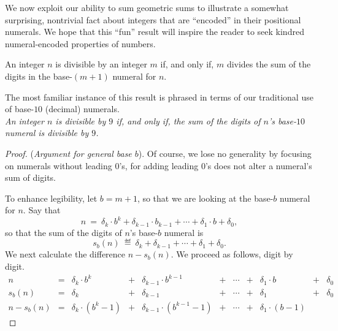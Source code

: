 {\medskip


We now exploit our ability to sum geometric sums to illustrate a
somewhat surprising, nontrivial fact about integers that are
``encoded'' in their positional numerals.  We hope that this ``fun''
result will inspire the reader to seek kindred numeral-encoded
properties of numbers.

\begin{prop}
\label{thm:div-by-b-bar}
An integer $n$ is divisible by an integer $m$ if, and only if, $m$
divides the sum of the digits in the base-$(m+1)$ numeral for $n$.
\end{prop}

The most familiar instance of this result is phrased in terms of our
traditional use of base-$10$ (decimal) numerals. \\
{\it An integer $n$ is divisible by $9$ if, and only if, the sum of
  the digits of $n$'s base-$10$ numeral is divisible by $9$.}

\smallskip

\begin{proof}
({\it Argument for general base $b$}).
%
Of course, we lose no generality by focusing on numerals without
leading $0$'s, for adding leading $0$'s does not alter a numeral's sum
of digits.

To enhance legibility, let $b = m+1$, so that we are looking at the
base-$b$ numeral for $n$.  Say that
\[ n \ = \ \delta_k \cdot b^k + \delta_{k-1} \cdot b_{k-1} + \cdots +
\delta_1 \cdot b + \delta_0, \]
so that the sum of the digits of $n$'s base-$b$ numeral is
\[ s_b(n) \ \eqdef \ \delta_k + \delta_{k-1} + \cdots + \delta_1 + \delta_0. \]
We next calculate the difference $n - s_b(n)$.  We proceed as
follows, digit by digit.
\begin{equation}
\label{eq:sum-of-digits}
\begin{array}{ccccccccccc}
n & = &
\delta_k \cdot b^k & + & \delta_{k-1} \cdot b^{k-1} & + & \cdots
  & + & \delta_1 \cdot b & + & \delta_0 \\
s_b(n) & = &
\delta_k & + & \delta_{k-1} & + & \cdots & + & \delta_1 & + & \delta_0 \\
\hline
n - s_b(n) & = &
\delta_k \cdot (b^k -1) & + &
\delta_{k-1} \cdot (b^{k-1} -1) & + &
\cdots & + &
\delta_1 \cdot (b-1) & & 
\end{array}
\end{equation}


\end{proof}}
